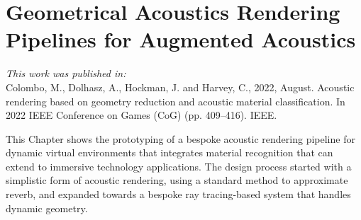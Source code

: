 \chapter{Geometrical Acoustics Rendering Pipelines for Augmented Acoustics}\label{ch:acoustic-rendering} %

\textit{This work was published in:}\\

Colombo, M., Dolhasz, A., Hockman, J. and Harvey, C., 2022, August. Acoustic rendering based on geometry reduction and acoustic material classification. In 2022 IEEE Conference on Games (CoG) (pp. 409--416). IEEE.\\
\bigskip

This Chapter shows the prototyping of a bespoke acoustic rendering pipeline for dynamic virtual environments that integrates material recognition that can extend to immersive technology applications. The design process started with a simplistic form of acoustic rendering, using a standard method to approximate reverb, and expanded towards a bespoke ray tracing-based system that handles dynamic geometry.

